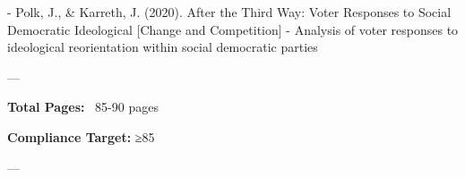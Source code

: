- Polk, J., \& Karreth, J. (2020). After the Third Way: Voter Responses to Social Democratic Ideological [Change and Competition]
  - Analysis of voter responses to ideological reorientation within social democratic parties

\nocite{bcm_master}

---

\textbf{Total Pages:} ~85-90 pages

\textbf{Compliance Target:} ≥85%

---



